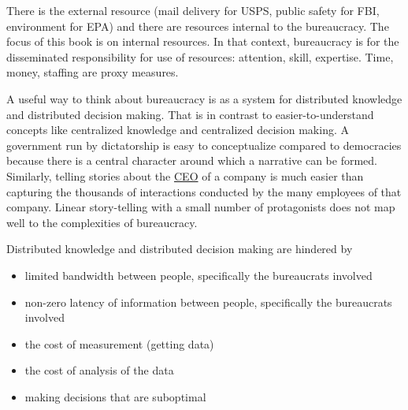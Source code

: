 There is the external resource (mail delivery for USPS, public safety for FBI, environment for EPA) and there are resources internal to the bureaucracy. The focus of this book is on internal resources. In that context, bureaucracy is for the disseminated responsibility for use of resources: attention, skill, expertise. Time, money, staffing are proxy measures.



A useful way to think about bureaucracy is as a system for distributed knowledge and distributed decision making. That is in contrast to easier-to-understand concepts like centralized knowledge and centralized decision making. A government run by dictatorship is easy to conceptualize compared to democracies because there is a central character around which a narrative can be formed. Similarly, telling stories about the \href{https://en.wikipedia.org/wiki/Chief_executive_officer}{CEO} of a company is much easier than capturing the thousands of interactions conducted by the many employees of that company. Linear story-telling with a small number of protagonists does not map well to the complexities of bureaucracy. 


Distributed knowledge and distributed decision making are hindered by
\begin{itemize}
    \item limited bandwidth between people, specifically the bureaucrats involved
    \item non-zero latency of information between people, specifically the bureaucrats involved
    \item the cost of measurement (getting data)
    \item the cost of analysis of the data
    \item making decisions that are suboptimal
\end{itemize}

